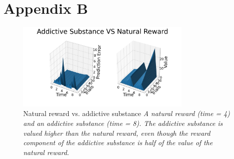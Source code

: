 \documentclass[10pt,letterpaper]{article}
\begin{document}
\section{Appendix B}
\begin{figure}[H]
   \centering
    \includegraphics[width = 85mm]{graphs/both.png}
    \caption{Natural reward vs. addictive substance
    \newline \emph{A natural reward (time = 4) and an addictive substance (time = 8). The addictive substance is valued higher than the natural reward, even though the reward component of the addictive substance is half of the value of the natural reward.}}
    \label{fig:Baseline}
\end{figure}




\setlength{\bibleftmargin}{.125in}
\setlength{\bibindent}{-\bibleftmargin}


\end{document}
